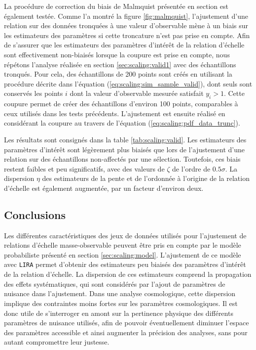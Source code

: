 La procédure de correction du biais de Malmquist présentée en section  est également testée.
Comme l'a montré la figure \ref{fig:malmquist}, l'ajustement d'une relation sur des données tronquées à une valeur d'observable mène à un biais sur les estimateurs des paramètres si cette troncature n'est pas prise en compte.
Afin de s'assurer que les estimateurs des paramètres d'intérêt de la relation d'échelle sont effectivement non-biaisés lorsque la coupure est prise en compte, nous répétons l'analyse réalisée en section \ref{sec:scaling:valid1} avec des échantillons tronqués.
Pour cela, des échantillons de 200 points sont créés en utilisant la procédure décrite dans l'équation (\ref{eq:scaling:sim_sample_valid}), dont seuls sont conservés les points $i$ dont la valeur d'observable mesurée satisfait $y_i > 1$.
Cette coupure permet de créer des échantillons d'environ 100 points, comparables à ceux utilisés dans les tests précédents.
L'ajustement est ensuite réalisé en considérant la coupure au travers de l'équation (\ref{eq:scaling:pdf_data_trunc}).

Les résultats sont consignés dans la table \ref{tab:scaling:valid}.
Les estimateurs des paramètres d'intérêt sont légèrement plus biaisés que lors de l'ajustement d'une relation sur des échantillons non-affectés par une sélection.
Toutefois, ces biais restent faibles et peu significatifs, avec des valeurs de $\zeta$ de l'ordre de $0.5\sigma$.
La dispersion $\eta$ des estimateurs de la pente et de l'ordonnée à l'origine de la relation d'échelle est également augmentée, par un facteur d'environ deux.

\subsection*{Conclusions}

Les différentes caractéristiques des jeux de données utilisés pour l'ajustement de relations d'échelle masse-observable peuvent être pris en compte par le modèle probabiliste présenté en section \ref{sec:scaling:model}.
L'ajustement de ce modèle avec \texttt{LIRA} permet d'obtenir des estimateurs peu biaisés des paramètres d'intérêt de la relation d'échelle.
La dispersion de ces estimateurs comprend la propagation des effets systématiques, qui sont considérés par l'ajout de paramètres de nuisance dans l'ajustement.
Dans une analyse cosmologique, cette dispersion implique des contraintes moins fortes sur les paramètres cosmologiques.
Il est donc utile de s'interroger en amont sur la pertinence physique des différents paramètres de nuisance utilisés, afin de pouvoir éventuellement diminuer l'espace des paramètres accessible et ainsi augmenter la précision des analyses, sans pour autant compromettre leur justesse.

